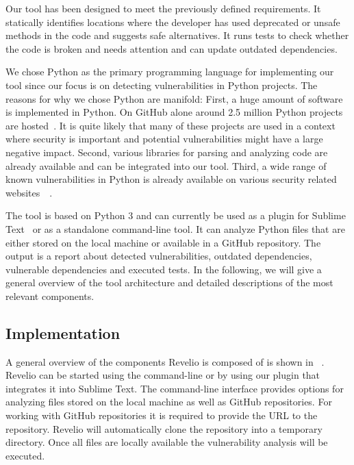 Our tool has been designed to meet the previously defined requirements. It statically identifies locations where the developer has used deprecated or unsafe methods in the code and suggests safe alternatives. It runs tests to check whether the code is broken and needs attention and can update outdated dependencies.

We chose Python as the primary programming language for implementing our tool since our focus is on detecting vulnerabilities in Python projects. The reasons for why we chose Python are manifold: First, a huge amount of software is implemented in Python. On GitHub alone around 2.5 million Python projects are hosted~\cite{ghpython}. It is quite likely that many of these projects are used in a context where security is important and potential vulnerabilities might have a large negative impact. Second, various libraries for parsing and analyzing code are already available and can be integrated into our tool. Third, a wide range of known vulnerabilities in Python is already available on various security related websites~\cite{cvedetails}~\cite{openstack}. 

The tool is based on Python 3 and can currently be used as a plugin for Sublime Text~\cite{sublime} or as a standalone command-line tool. It can analyze Python files that are either stored on the local machine or available in a GitHub repository. The output is a report about detected vulnerabilities, outdated dependencies, vulnerable dependencies and executed tests. In the following, we will give a general overview of the tool architecture and detailed descriptions of the most relevant components.

\subsection{Implementation}


A general overview of the components Revelio is composed of is shown in ~. Revelio can be started using the command-line or by using our plugin that integrates it into Sublime Text. The command-line interface provides options for analyzing files stored on the local machine as well as GitHub repositories. For working with GitHub repositories it is required to provide the URL to the repository. Revelio will automatically clone the repository into a temporary directory. Once all files are locally available the vulnerability analysis will be executed.

